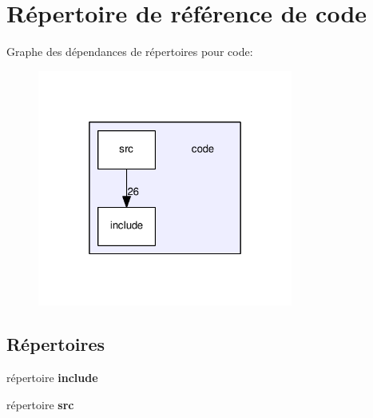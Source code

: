 \section{Répertoire de référence de code}
\label{dir_050edd66366d13764f98250ef6db77f6}
Graphe des dépendances de répertoires pour code\-:
\nopagebreak
\begin{figure}[H]
\begin{center}
\leavevmode
\includegraphics[width=238pt]{dir_050edd66366d13764f98250ef6db77f6_dep}
\end{center}
\end{figure}
\subsection*{Répertoires}
\begin{DoxyCompactItemize}
\item 
répertoire {\bf include}
\item 
répertoire {\bf src}
\end{DoxyCompactItemize}
